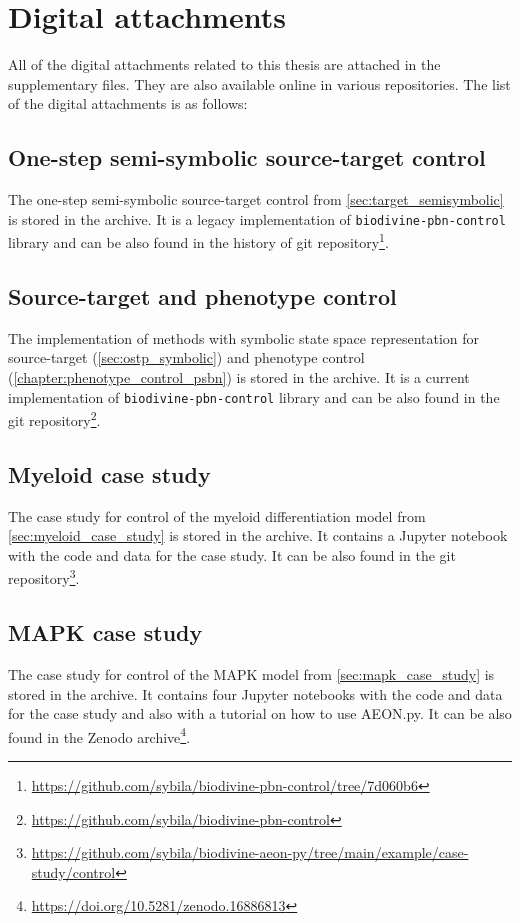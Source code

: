 \chapter{Digital attachments}

\label{appendix:digi_attach}

All of the digital attachments related to this thesis are attached in the supplementary files. They are also available online in various repositories. The list of the digital attachments is as follows:

\section*{One-step semi-symbolic source-target control} 
The one-step semi-symbolic source-target control from \autoref{sec:target_semisymbolic} is stored in the  archive. It is a legacy implementation of \texttt{biodivine-pbn-control} library and can be also found in the history of git repository\footnote{\url{https://github.com/sybila/biodivine-pbn-control/tree/7d060b6}}.

\section*{Source-target and phenotype control}
The implementation of methods with symbolic state space representation for source-target (\autoref{sec:ostp_symbolic}) and phenotype control (\autoref{chapter:phenotype_control_psbn}) is stored in the  archive. It is a current implementation of \texttt{biodivine-pbn-control} library and can be also found in the git repository\footnote{\url{https://github.com/sybila/biodivine-pbn-control}}.

\section*{Myeloid case study}
The case study for control of the myeloid differentiation model from \autoref{sec:myeloid_case_study} is stored in the  archive. It contains a Jupyter notebook with the code and data for the case study. It can be also found in the git repository\footnote{\url{https://github.com/sybila/biodivine-aeon-py/tree/main/example/case-study/control}}.

\section*{MAPK case study}
The case study for control of the MAPK model from \autoref{sec:mapk_case_study} is stored in the  archive. It contains four Jupyter notebooks with the code and data for the case study and also with a tutorial on how to use AEON.py. It can be also found in the Zenodo archive\footnote{\url{https://doi.org/10.5281/zenodo.16886813}}.


